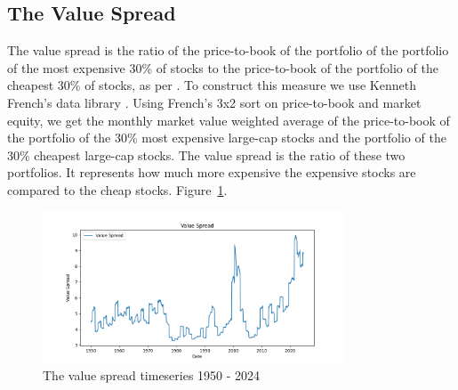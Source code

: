 \subsection{The Value Spread}

The value spread is the ratio of the price-to-book of the portfolio of the portfolio of the most expensive 30\% of stocks to the price-to-book of the portfolio of the cheapest 30\% of stocks, as per \citet{fama_french_1993}.
To construct this measure we use Kenneth French's data library \citep{french_website}. 
Using French’s 3x2 sort on price-to-book and market equity, we get the monthly market value weighted average of the price-to-book of the portfolio of the 30\% most expensive large-cap stocks and the portfolio of the 30\% cheapest large-cap stocks. The value spread is the ratio of these two portfolios.
It represents how much more expensive the expensive stocks are compared to the cheap stocks.
 Figure~\ref{fig:value_spread}.

\begin{figure}[h!]
    \centering
    \includegraphics[width=0.8\textwidth]{../figs/Value Spread.png}
    \caption{The value spread timeseries 1950 - 2024}
    \label{fig:value_spread}
\end{figure}
